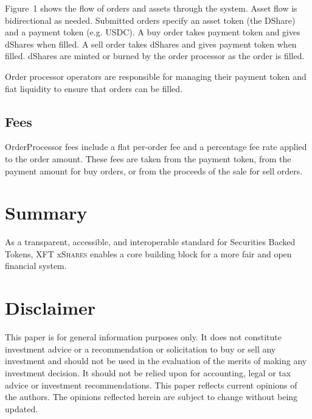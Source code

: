 \documentclass[sigconf,nonacm,prologue,table]{acmart}
\newcommand{\dshares}{\textsc{XFT} x\textsc{Shares} }
\begin{document}
Figure~1 shows the flow of orders and assets through the system. Asset flow is bidirectional as needed. Submitted orders specify an asset token (the DShare) and a payment token (e.g. USDC). A buy order takes payment token and gives dShares when filled. A sell order takes dShares and gives payment token when filled. dShares are minted or burned by the order processor as the order is filled. 

Order processor operators are responsible for managing their payment token and fiat liquidity to ensure that orders can be filled.

\subsection{Fees}

OrderProcessor fees include a flat per-order fee and a percentage fee rate applied to the order amount. These fees are taken from the payment token, from the payment amount for buy orders, or from the proceeds of the sale for sell orders.

\section{Summary}

As a transparent, accessible, and interoperable standard for Securities Backed Tokens, \dshares enables a core building block for a more fair and open financial system.

% 
% 

\section*{Disclaimer}

This paper is for general information purposes only. It does not constitute investment advice or a recommendation or solicitation to buy or sell any investment and should not be used in the evaluation of the merits of making any investment decision. It should not be relied upon for accounting, legal or tax advice or investment recommendations.  This paper reflects current opinions of the authors. The opinions reflected herein are subject to change without being updated. 

\newpage
\phantom{.}
\end{document}
